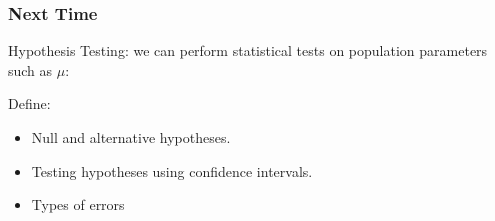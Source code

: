 \documentclass[slides]{beamer}
\newcommand{\blue}[1]{\textcolor{blue2}{#1}}
\begin{document}
\begin{frame}[fragile]
\frametitle{Next Time}

Hypothesis Testing:  we can perform \blue{statistical tests} on population parameters such as $\mu$:

\vspace{0.5cm}

Define:
\begin{itemize}
\item Null and alternative hypotheses.
\item Testing hypotheses using confidence intervals.
\item Types of errors
\end{itemize}

\end{frame}
\end{document}
